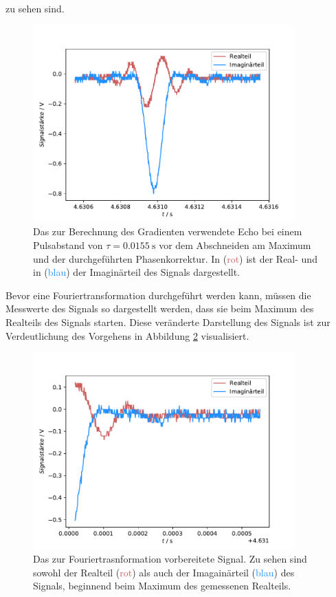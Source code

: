 zu sehen sind.
\begin{figure}[H]
  \centering
  \includegraphics[width=0.9\textwidth]{../Auswertung/echo_vorher.pdf}
  \caption{Das zur Berechnung des Gradienten verwendete Echo bei einem Pulsabstand von $\tau = \SI{0.0155}{\second}$ 
  vor dem Abschneiden am Maximum und der durchgeführten 
  Phasenkorrektur. In (\textcolor{indianred}{rot}) ist der Real- und in (\textcolor{dodgerblue}{blau}) der Imaginärteil des Signals dargestellt.}
  \label{fig:echo_vorher}
\end{figure} \noindent
Bevor eine Fouriertransformation durchgeführt werden kann, müssen die Messwerte des Signals so dargestellt werden, dass sie 
beim Maximum des Realteils des Signals starten. Diese veränderte Darstellung des Signals ist zur Verdeutlichung des Vorgehens in 
Abbildung \ref{fig:echo_ab} visualisiert.
\begin{figure}[H]
  \centering
  \includegraphics[width=0.9\textwidth]{../Auswertung/echo_abgeschnitten.pdf}
  \caption{Das zur Fouriertrasnformation vorbereitete Signal. Zu sehen sind sowohl der Realteil (\textcolor{indianred}{rot}) als auch der 
  Imagainärteil (\textcolor{dodgerblue}{blau}) des Signals, beginnend beim Maximum des gemessenen Realteils.}
  \label{fig:echo_ab}
\end{figure} \noindent
